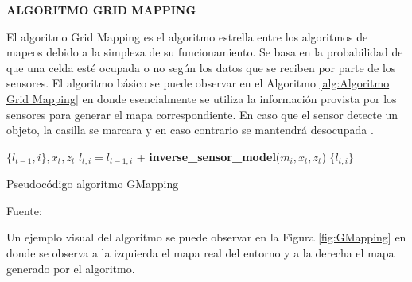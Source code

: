 \textbf{ALGORITMO GRID MAPPING}

El algoritmo Grid Mapping es el algoritmo estrella entre los algoritmos de mapeos debido a la simpleza de su funcionamiento. Se basa en la probabilidad de que una celda esté ocupada o no según los datos que se reciben por parte de los sensores. El algoritmo básico se puede observar en el Algoritmo \ref{alg:Algoritmo Grid Mapping} en donde esencialmente se utiliza la información provista por los sensores para generar el mapa correspondiente. En caso que el sensor detecte un objeto, la casilla se marcara y en caso contrario se mantendrá desocupada \cite{sankalprajan_comparative_2020}. 

\begin{algorithm}[H]
\centering
    \begin{algorithmic}[1]
        \Require $\{l_{t-1},i\}, x_{t}, z_{t}$
        \vspace{1mm}
        \hline
        \vspace{1mm}
                \State $l_{t,i} = l_{t-1,i} $ + \textbf{inverse\_sensor\_model}($m_{i}, x_{t}, z_{t}$)
            \EndIf
        \EndFor
        \State \Return $\{l_{t,i}\}$
        \vspace{1mm}
        \hline
        \vspace{1mm}
    \end{algorithmic}
\caption{Pseudocódigo algoritmo GMapping}
Fuente: \cite{thrun_probabilistic_2005}
\label{alg:Algoritmo Grid Mapping}
\end{algorithm}

Un ejemplo visual del algoritmo se puede observar en la Figura \ref{fig:GMapping} en donde se observa a la izquierda el mapa real del entorno y a la derecha el mapa generado por el algoritmo.

